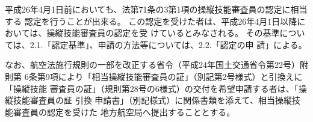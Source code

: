 \documentclass[a4paper,papersize,12pt]{jsarticle}
\begin{document}
\begin{fusoku}
\end{fusoku}
\begin{fusoku}[令和3年2月5日創第0号]
\end{fusoku}
\begin{fusokushou}
\end{fusokushou}
\begin{fusokushou}[令和3年2月5日創第0号]
\heading[施行期日]
\heading[経過措置]

平成26年4月1日前においても、法第71条の3第1項の操縦技能審査員の認定に相当する
認定を行うことが出来る。
この認定を受けた者は、平成26年4月1日以降においては、操縦技能審査員の認定を受
けているとみなされる。
その基準については、2.1.「認定基準」、申請の方法等については、2.2.「認定の申
請」による。

なお、航空法施行規則の一部を改正する省令（平成24年国土交通省令第22号）附則第
6条第9項により「相当操縦技能審査員の証」（別記第2号様式）と引換えに「操縦技能
審査員の証」（規則第28号の6様式）の交付を希望申請する者は、「操縦技能審査員の証
引換 申請書」（別記様式）に関係書類を添えて、相当操縦技能審査員の認定を受けた
地方航空局へ提出することとする。

\sakujo{\kou}
\end{fusokushou}

\besshi[1]
\besshi[2]
\besshirimen[2]
\youshiki
\youshiki[1-1]
\youshiki[2]
\youshikirimen[2]
\end{document}
